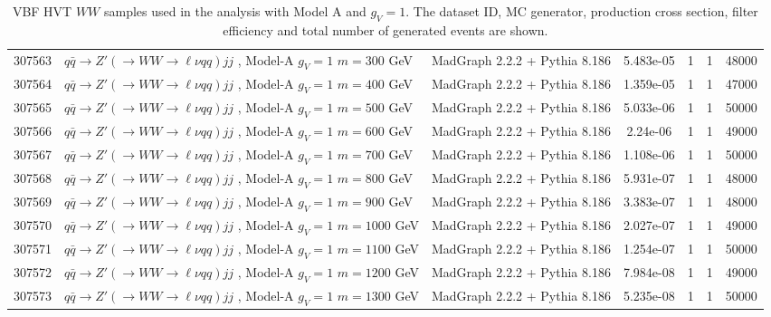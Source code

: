 \begin{landscape}
	\begin{table}[!htb]
		\caption{VBF HVT $WW$ samples used in the analysis with Model A and $g_V=1$. The dataset ID, MC generator, production cross section, filter efficiency and total number of generated events are shown.}
		\label{tabular:mc_samples_ZprimeVBF}
		\begin{footnotesize}
			\begin{center}
				\begin{tabular}{|c|l|c|c|c|c|r|}
					\hline
					307563 & $q\bar{q} \to Z'\left(\to WW \to \ell\nu qq\right) jj$ , Model-A $g_V=1$ $m=300$  GeV& MadGraph 2.2.2 + Pythia 8.186 & 5.483e-05 & 1 & 1 & 48000 \\
					307564 & $q\bar{q} \to Z'\left(\to WW \to \ell\nu qq\right) jj$ , Model-A $g_V=1$ $m=400$  GeV& MadGraph 2.2.2 + Pythia 8.186 & 1.359e-05 & 1 & 1 & 47000 \\
					307565 & $q\bar{q} \to Z'\left(\to WW \to \ell\nu qq\right) jj$ , Model-A $g_V=1$ $m=500$  GeV& MadGraph 2.2.2 + Pythia 8.186 & 5.033e-06 & 1 & 1 & 50000 \\
					307566 & $q\bar{q} \to Z'\left(\to WW \to \ell\nu qq\right) jj$ , Model-A $g_V=1$ $m=600$  GeV& MadGraph 2.2.2 + Pythia 8.186 & 2.24e-06 & 1 & 1 & 49000 \\ 
					307567 & $q\bar{q} \to Z'\left(\to WW \to \ell\nu qq\right) jj$ , Model-A $g_V=1$ $m=700$  GeV& MadGraph 2.2.2 + Pythia 8.186 & 1.108e-06 & 1 & 1 & 50000 \\
					307568 & $q\bar{q} \to Z'\left(\to WW \to \ell\nu qq\right) jj$ , Model-A $g_V=1$ $m=800$  GeV& MadGraph 2.2.2 + Pythia 8.186 & 5.931e-07 & 1 & 1 & 48000 \\
					307569 & $q\bar{q} \to Z'\left(\to WW \to \ell\nu qq\right) jj$ , Model-A $g_V=1$ $m=900$  GeV& MadGraph 2.2.2 + Pythia 8.186 & 3.383e-07 & 1 & 1 & 48000 \\
					307570 & $q\bar{q} \to Z'\left(\to WW \to \ell\nu qq\right) jj$ , Model-A $g_V=1$ $m=1000$ GeV& MadGraph 2.2.2 + Pythia 8.186 & 2.027e-07 & 1 & 1 & 49000 \\
					307571 & $q\bar{q} \to Z'\left(\to WW \to \ell\nu qq\right) jj$ , Model-A $g_V=1$ $m=1100$ GeV& MadGraph 2.2.2 + Pythia 8.186  & 1.254e-07 & 1 & 1 & 50000 \\
					307572 & $q\bar{q} \to Z'\left(\to WW \to \ell\nu qq\right) jj$ , Model-A $g_V=1$ $m=1200$ GeV& MadGraph 2.2.2 + Pythia 8.186 & 7.984e-08 & 1 & 1 & 49000 \\
					307573 & $q\bar{q} \to Z'\left(\to WW \to \ell\nu qq\right) jj$ , Model-A $g_V=1$ $m=1300$ GeV& MadGraph 2.2.2 + Pythia 8.186 & 5.235e-08 & 1 & 1 & 50000 \\

\end{tabular}
\end{center}
\end{footnotesize}
\end{table}
\end{landscape}
